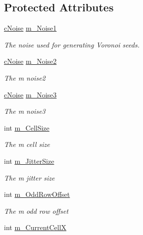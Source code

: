 \subsection*{Protected Attributes}
\begin{DoxyCompactItemize}
\item 
\mbox{\label{classc_voronoi_map_a2565e8e2bb4ba10e7923eb7e0dbea6b2}} 
\hyperlink{classc_noise}{c\+Noise} \hyperlink{classc_voronoi_map_a2565e8e2bb4ba10e7923eb7e0dbea6b2}{m\+\_\+\+Noise1}
\begin{DoxyCompactList}\small\item\em The noise used for generating Voronoi seeds. \end{DoxyCompactList}\item 
\hyperlink{classc_noise}{c\+Noise} \hyperlink{classc_voronoi_map_a3f736d8c9bc58272b6584c6a3b4b8b8b}{m\+\_\+\+Noise2}
\begin{DoxyCompactList}\small\item\em The m noise2 \end{DoxyCompactList}\item 
\hyperlink{classc_noise}{c\+Noise} \hyperlink{classc_voronoi_map_a9259dff98ecde7bf8e86587f840cd183}{m\+\_\+\+Noise3}
\begin{DoxyCompactList}\small\item\em The m noise3 \end{DoxyCompactList}\item 
int \hyperlink{classc_voronoi_map_a4499b76db7e044d52c40482191ada510}{m\+\_\+\+Cell\+Size}
\begin{DoxyCompactList}\small\item\em The m cell size \end{DoxyCompactList}\item 
int \hyperlink{classc_voronoi_map_a4645ec081dfc565552f244fc4bd1ec01}{m\+\_\+\+Jitter\+Size}
\begin{DoxyCompactList}\small\item\em The m jitter size \end{DoxyCompactList}\item 
int \hyperlink{classc_voronoi_map_ad9ad1936c8ef202c65c51d4524684094}{m\+\_\+\+Odd\+Row\+Offset}
\begin{DoxyCompactList}\small\item\em The m odd row offset \end{DoxyCompactList}\item 
int \hyperlink{classc_voronoi_map_a7a3f75df3996c131803da750682b2c6b}{m\+\_\+\+Current\+CellX}

\end{DoxyCompactItemize}
